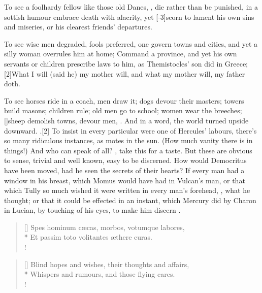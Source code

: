 {To see a foolhardy fellow like those old Danes, , die rather than be punished, in a sottish humour
embrace death with alacrity, yet [-3\baselineskip]scorn to lament his own sins and
miseries, or his clearest friends' departures.

To see wise men degraded, fools preferred, one govern towns and cities,
and yet a silly woman overrules him at home; Command a province,
and yet his own servants or children prescribe laws to him, as
Themistocles' son did in Greece; [2\baselineskip]What I will (said he) my mother
will, and what my mother will, my father doth.

To see horses ride in a coach, men draw it; dogs devour their masters; towers build masons;
children rule; old men go to school; women wear the breeches;
[\baselineskip]sheep demolish towns, devour men, \etc{}. And in a word, the world
turned upside downward. .[2\baselineskip] To insist in every particular were one of Hercules' labours,
there's so many ridiculous instances, as motes in the sun.  (How much vanity there is in things!) And who can speak
of all? , take this for a taste.
But these are obvious to sense, trivial and well known, easy to be
discerned. How would Democritus have been moved, had he seen the
secrets of their hearts? If every man had a window in his breast, which
Momus would have had in Vulcan's man, or that which Tully so much
wished it were written in every man's forehead, , what he thought; or that it could be effected in an
instant, which Mercury did by Charon in Lucian, by touching of his
eyes, to make him discern .

\begin{verse}[\versewidth]
\textlatin{Spes hominum c\ae{}cas, morbos, votumque labores,}\\*
\textlatin{Et passim toto volitantes \ae{}there curas.}\\!
\end{verse}

\settowidth{\versewidth}{Blind hopes and wishes, their thoughts and affairs,}
\begin{verse}[\versewidth]
Blind hopes and wishes, their thoughts and affairs,\\*
Whispers and rumours, and those flying cares.\\!
\end{verse}

}

